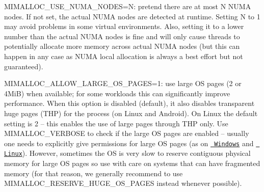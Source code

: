 \begin{DoxyItemize}
\item {\ttfamily MIMALLOC\+\_\+\+USE\+\_\+\+NUMA\+\_\+\+NODES=N}\+: pretend there are at most {\ttfamily N} NUMA nodes. If not set, the actual NUMA nodes are detected at runtime. Setting {\ttfamily N} to 1 may avoid problems in some virtual environments. Also, setting it to a lower number than the actual NUMA nodes is fine and will only cause threads to potentially allocate more memory across actual NUMA nodes (but this can happen in any case as NUMA local allocation is always a best effort but not guaranteed).
\item {\ttfamily MIMALLOC\+\_\+\+ALLOW\+\_\+\+LARGE\+\_\+\+OS\+\_\+\+PAGES=1}\+: use large OS pages (2 or 4MiB) when available; for some workloads this can significantly improve performance. When this option is disabled (default), it also disables transparent huge pages (THP) for the process (on Linux and Android). On Linux the default setting is 2 -- this enables the use of large pages through THP only. Use {\ttfamily MIMALLOC\+\_\+\+VERBOSE} to check if the large OS pages are enabled -- usually one needs to explicitly give permissions for large OS pages (as on \href{https://docs.microsoft.com/en-us/sql/database-engine/configure-windows/enable-the-lock-pages-in-memory-option-windows?view=sql-server-2017}{\texttt{ Windows}} and \href{https://access.redhat.com/documentation/en-us/red_hat_enterprise_linux/5/html/tuning_and_optimizing_red_hat_enterprise_linux_for_oracle_9i_and_10g_databases/sect-oracle_9i_and_10g_tuning_guide-large_memory_optimization_big_pages_and_huge_pages-configuring_huge_pages_in_red_hat_enterprise_linux_4_or_5}{\texttt{ Linux}}). However, sometimes the OS is very slow to reserve contiguous physical memory for large OS pages so use with care on systems that can have fragmented memory (for that reason, we generally recommend to use {\ttfamily MIMALLOC\+\_\+\+RESERVE\+\_\+\+HUGE\+\_\+\+OS\+\_\+\+PAGES} instead whenever possible).

\end{DoxyItemize}
